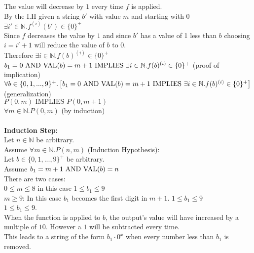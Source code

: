 \documentclass[11pt]{article}
\newcommand{\Implies}{\mbox{ IMPLIES }}
\newcommand{\And}{\mbox{ AND }}
\def\nats{{\mathbb N}}
\begin{document}
\begin{enumerate}
\begin{solution}
    \null\qquad\qquad The value will decrease by $1$ every time $f$ is applied.\\
    \null\qquad\qquad By the I.H given a string $b'$ with value $m$ and starting with $0$ $\exists i'\in\nats.f^{(i)}(b')\in\{0\}^+$\\
    \null\qquad\qquad Since $f$ decreases the value by $1$ and since $b'$ has a value of 1 less than $b$ choosing\\
    \null\qquad\qquad $i = i'+ 1$ will reduce the value of $b$ to $0$.\\
    \null\qquad\qquad Therefore $\exists i\in\nats.f(b)^{(i)}\in\{0\}^+$\\
    \null\qquad\quad $b_1 = 0 \And {\rm VAL}(b) = m +1\Implies \exists i\in\nats.f(b)^{(i)}\in\{0\}^+$ (proof of implication)\\
    \null\qquad $\forall b\in\{0,1,...,9\}^+.\left[b_1 = 0 \And {\rm VAL}(b) = m +1\Implies \exists i\in\nats.f(b)^{(i)}\in\{0\}^+\right]$ \\
    \null\qquad (generalization)\\
    \null\quad $P(0,m)\Implies P(0,m+1)$\\
    $\forall m\in\nats. P(0,m)$ (by induction)\\\\
    {\bf Induction Step:}\\
    \null\quad Let $n\in\nats$ be arbitrary.\\
    \null\qquad Assume $\forall m\in\nats.P(n, m)$ (Induction Hypothesis):\\
    \null\qquad\quad Let $b\in \{0,1,...,9\}^+$ be arbitrary.\\
    \null\qquad\qquad Assume $b_1 = m+1 \And {\rm VAL}(b) = n$\\
    \null\qquad\qquad There are two cases:\\
    \null\qquad\qquad $0\le m \le 8$ in this case $1\le b_1\le 9 $\\
    \null\qquad\qquad $m\ge 9$: In this case $b_1$ becomes the first digit in $m+1$. $1\le b_1\le 9 $\\
    \null\qquad\qquad $1\le b_1\le 9$.\\
    \null\qquad\qquad When the function is applied to $b$, the output's value will have increased by a \\
    \null\qquad\qquad multiple of $10$. However a $1$ will be subtracted every time.\\
    \null\qquad\qquad This leads to a string of the form $b_1\cdot 0^x$ when every number less than $b_1$ is removed.\\

\end{solution}
\end{enumerate}
\end{document}
